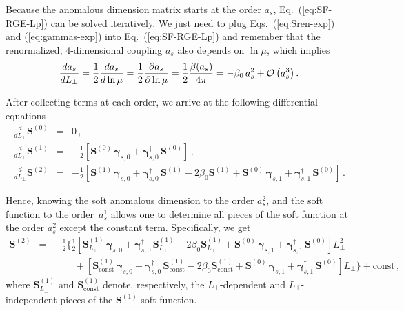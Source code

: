 \documentclass[a4paper,11pt]{report}
\numberwithin{equation}{section}
\newcommand{\bfS}{\bm{S}}
\newcommand{\bfgamma}{\bm{\gamma}}
\begin{document}
Because the anomalous dimension matrix starts at the order $a_s$,
Eq.~(\ref{eq:SF-RGE-Lp}) can be solved iteratively. We just need to plug
Eqs.~(\ref{eq:Sren-exp}) and (\ref{eq:gammas-exp}) into 
Eq.~(\ref{eq:SF-RGE-Lp}) and  remember that the renormalized, 4-dimensional
coupling $a_s$ also depends on $\ln\mu$, which implies
%
\begin{equation}
  \frac{d a_s}{dL_\perp} = \frac12 \frac{d a_s}{d\ln\mu} = 
  \frac12 \frac{\partial a_s}{\partial \ln\mu} = 
  \frac12 \frac{\beta(a_s)}{4\pi} = 
  - \beta_0\, a_s^2 + {{\cal O}\left(a_s^3\right)}\,.
\end{equation}

After collecting terms at each order, we
arrive at the following differential equations
%
\begin{eqnarray}
  \frac{d}{dL_\perp} \bfS^{(0)} & = &  0\,,
  \\
  \frac{d}{dL_\perp} \bfS^{(1)} & = & 
  -\frac12\left[
  \bfS^{(0)}\, \bfgamma_{s,0} + \bfgamma_{s,0}^\dagger\, \bfS^{(0)} 
  \right]\,,
  \\
  \frac{d}{dL_\perp} \bfS^{(2)} & = & 
  -\frac12\left[
  \bfS^{(1)}\, \bfgamma_{s,0} + \bfgamma_{s,0}^\dagger\, \bfS^{(1)}  
  - 2 \beta_0 \bfS^{(1)}  +
  \bfS^{(0)}\, \bfgamma_{s,1} + \bfgamma_{s,1}^\dagger\, \bfS^{(0)} 
  \right]\,.
\end{eqnarray}
 
Hence, knowing the soft anomalous dimension to the order $a_s^2$, and the soft
function to the order~$a_s^1$ allows one to determine all pieces of the soft
function at the order $a_s^2$ except the constant term. Specifically, we get
%
\begin{eqnarray}
  \bfS^{(2)} 
  & = & 
  -\frac12\Bigg\{
  \frac12\left[
  \bfS^{(1)}_{L_\perp}\, \bfgamma_{s,0} + 
  \bfgamma_{s,0}^\dagger\, \bfS^{(1)}_{L_\perp}  
  - 2 \beta_0 \bfS^{(1)}_{L_\perp}  +
  \bfS^{(0)}\, \bfgamma_{s,1} + \bfgamma_{s,1}^\dagger\, \bfS^{(0)} 
  \right] L_\perp^2
   \\
  & &
  \hspace{25pt} + \left[
  \bfS^{(1)}_\text{const}\, \bfgamma_{s,0} + 
  \bfgamma_{s,0}^\dagger\, \bfS^{(1)}_\text{const}  
  - 2 \beta_0 \bfS^{(1)}_\text{const}  +
  \bfS^{(0)}\, \bfgamma_{s,1} + \bfgamma_{s,1}^\dagger\, \bfS^{(0)} 
  \right] L_\perp
  \Bigg\} 
  + \text{const}\,,
  \nonumber
\end{eqnarray}
%
where $\bfS^{(1)}_{L_\perp}$ and $\bfS^{(1)}_\text{const}$ denote, respectively,
the $L_\perp$-dependent and $L_\perp$-independent pieces of the $\bfS^{(1)}$
soft function.
\end{document}
